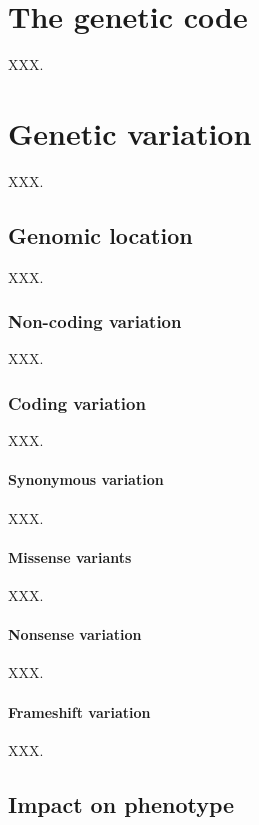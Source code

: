 \section{The genetic code}

XXX.

\section{Genetic variation}

XXX.

\subsection{Genomic location}

XXX.

\subsubsection{Non-coding variation}

XXX.

\subsubsection{Coding variation}

XXX.

\paragraph{Synonymous variation}

XXX.

\paragraph{Missense variants}

XXX.

\paragraph{Nonsense variation}

XXX.

\paragraph{Frameshift variation}

XXX.

\subsection{Impact on phenotype}

